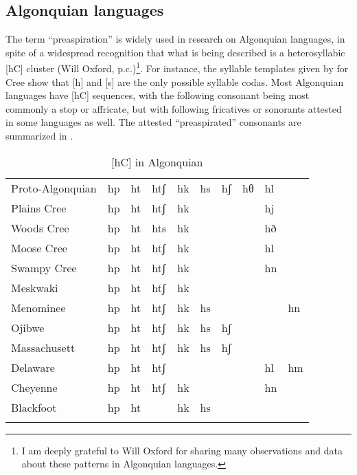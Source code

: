 \documentclass[output=paper,colorlinks,citecolor=brown]{langscibook}
\begin{document}
\subsection{Algonquian languages}
\label{sec-algonquian}
\largerpage[2]

The term ``preaspiration'' is widely used in research on Algonquian languages, in spite of a widespread recognition that what is being described is a heterosyllabic [hC] cluster (Will Oxford, p.c.)\footnote{I am deeply grateful to Will Oxford for sharing many observations and data about these patterns in Algonquian languages.}. For instance, the syllable templates given by \citet{wolfart1996} for Cree show that [h] and [s] are the only possible syllable codas. Most Algonquian languages have [{h}C] sequences, with the following consonant being most commonly a stop or affricate, but with following fricatives or sonorants attested in some languages as well. The attested ``preaspirated'' consonants are summarized in  
\citep[based on][]{bloomfield1925,bloomfield1946,davis1962,pentland1979,ellis1983,greensmith1985,hayes1995,wolfart1996,starksballard2003,schmirler2016,flynnetal2019}.

\begin{table}[h]
\caption{[{h}C] in Algonquian}
\label{tab:ex-algonquian-preaspiration}
	\begin{tabular}[t]{llllllllll}
		\lsptoprule
		Proto-Algonquian	& hp & ht & htʃ & hk & hs & hʃ & hθ & hl \\
		Plains Cree		& hp & ht & htʃ & hk &    &    &    & hj\\
		Woods Cree		& hp & ht & hts & hk &    &    &    & hð\\
		Moose Cree		& hp & ht & htʃ & hk &    &    &    & hl\\
		Swampy Cree		& hp & ht & htʃ & hk &    &    &    & hn\\
		Meskwaki		& hp & ht & htʃ & hk \\
		Menominee		& hp & ht & htʃ & hk & hs &  &  &  & hn \\
		Ojibwe			& hp & ht & htʃ & hk & hs & hʃ \\
		Massachusett		& hp & ht & htʃ & hk & hs & hʃ \\
		Delaware		& hp & ht & htʃ &  &  &  &  & hl & hm \\
		Cheyenne		& hp & ht & htʃ  & hk &   &   &   & hn\\
		Blackfoot		& hp & ht &  & hk & hs \\
		\lspbottomrule
	\end{tabular}
\end{table}
\end{document}
